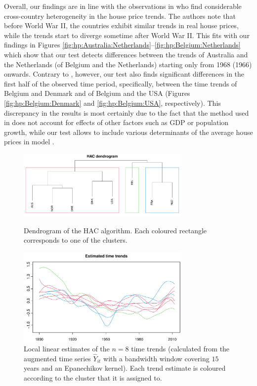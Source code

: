 \documentclass[12pt]{article}
\makeatletter
\renewcommand{\eqref}[1]{\tagform@{\ref{#1}}}
\makeatother
\begin{document}
Overall, our findings are in line with the observations in \cite{Knoll2017} who find considerable cross-country heterogeneity in the house price trends. The authors note that before World War II, the countries exhibit similar trends in real house prices, while the trends start to diverge sometime after World War II. This fits with our findings in Figures \ref{fig:hp:Australia:Netherlands}--\ref{fig:hp:Belgium:Netherlands} which show that our test detects differences between the trends of Australia and the Netherlands (of Belgium and the Netherlands) starting only from 1968 (1966) onwards. Contrary to \cite{Knoll2017}, however, our test also finds significant differences in the first half of the observed time period, specifically, between the time trends of Belgium and Denmark and of Belgium and the USA (Figures \ref{fig:hp:Belgium:Denmark} and \ref{fig:hp:Belgium:USA}, respectively). This discrepancy in the results is most certainly due to the fact that the method used in \cite{Knoll2017} does not account for effects of other factors such as GDP or population growth, while our test allows to include various determinants of the average house prices in model \eqref{eq:model:app4}. %


\begin{figure}[t!]
\begin{center}
\includegraphics[width=0.75\textwidth]{output/plots/hp/dendrogram}
\caption{Dendrogram of the HAC algorithm. Each coloured rectangle corresponds to one of the clusters.}\label{fig:hp:dend}

\includegraphics[width=0.75\textwidth]{output/plots/hp/all_clusters}
\caption{Local linear estimates of the $n=8$ time trends (calculated from the augmented time series $\widehat{Y}_{it}$ with a bandwidth window covering $15$ years and an Epanechikov kernel). Each trend estimate is coloured according to the cluster that it is assigned to. }\label{fig:hp:all_clusters}
\end{center}
\end{figure}
\end{document}
